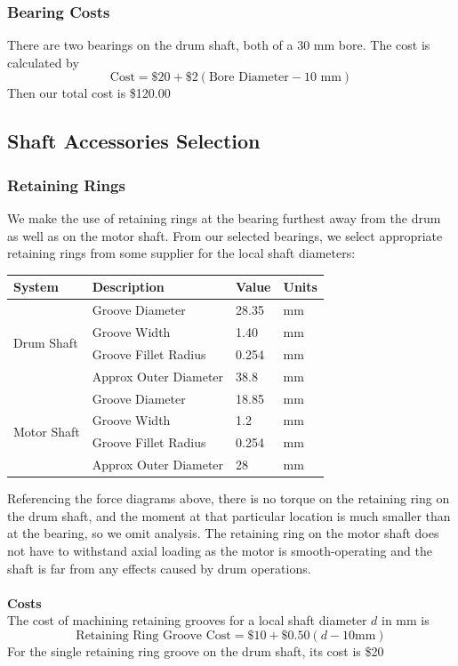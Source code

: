 \documentclass[letterpaper,12pt]{article}
\begin{document}
\subsubsection{Bearing Costs}

There are two bearings on the drum shaft, both of a 30 mm bore. The cost is calculated by
\begin{equation*}
    \text{Cost} = \$20 + \$2(\text{Bore Diameter} - 10 \text{ mm})
\end{equation*}
Then our total cost is \$120.00

\subsection{Shaft Accessories Selection}

\subsubsection{Retaining Rings}
We make the use of retaining rings at the bearing furthest away from the drum as well as on the motor shaft. From our selected bearings, we select appropriate retaining rings from some supplier \cite{rr} for the local shaft diameters:

\begin{center}
	\begin{tabular}{|p{1.5cm} |p{4cm}||p{1.5cm}|p{1.5cm}|  }
		\hline
		System & Description & Value & Units\\
		\hline
		\multirow{4}{4em}{Drum Shaft}
		& Groove Diameter & 28.35 & mm\\
		& Groove Width & 1.40 & mm\\
		& Groove Fillet Radius & 0.254 & mm\\
        & Approx Outer Diameter & 38.8 & mm\\
		\hline
		\hline
		\multirow{4}{4em}{Motor Shaft}
		& Groove Diameter & 18.85 & mm\\
		& Groove Width & 1.2 & mm\\
		& Groove Fillet Radius & 0.254 & mm\\
        & Approx Outer Diameter & 28 & mm\\
		\hline
	\end{tabular}
\end{center}

\noindent Referencing the force diagrams above, there is no torque on the retaining ring on the drum shaft, and the moment at that particular location is much smaller than at the bearing, so we omit analysis. The retaining ring on the motor shaft does not have to withstand axial loading as the motor is smooth-operating and the shaft is far from any effects caused by drum operations. 
\\\\
\textbf{Costs}
\\
The cost of machining retaining grooves for a local shaft diameter $d$ in mm is
\begin{equation*}
    \text{Retaining Ring Groove Cost} = \$10 + \$0.50(d - 10\text{mm})
\end{equation*}
For the single retaining ring groove on the drum shaft, its cost is \$20
\end{document}
